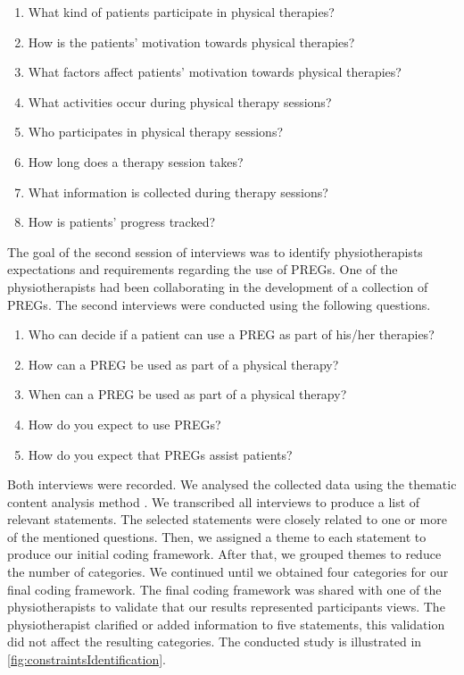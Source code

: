 \begin{enumerate}
    \item What kind of patients participate in physical therapies?
    \item How is the patients' motivation towards physical therapies?
    \item What factors affect patients' motivation towards physical therapies?
    \item What activities occur during physical therapy sessions?
    \item Who participates in physical therapy sessions?
    \item How long does a therapy session takes?
    \item What information is collected during therapy sessions?
    \item How is patients' progress tracked?
\end{enumerate}

The goal of the second session of interviews was to identify physiotherapists expectations and requirements regarding the use of \acp{PREG}. One of the physiotherapists had been collaborating in the development of a collection of \acp{PREG}. The second interviews were conducted using the following questions.

\begin{enumerate}
    \item Who can decide if a patient can use a \ac{PREG} as part of his/her therapies?
    \item How can a \ac{PREG} be used as part of a physical therapy?
    \item When can a \ac{PREG} be used as part of a physical therapy?
    \item How do you expect to use \acp{PREG}?
    \item How do you expect that \acp{PREG} assist patients?
\end{enumerate}

Both interviews were recorded. We analysed the collected data using the thematic content analysis method \autocite{Burnard2008}. We transcribed all interviews to produce a list of relevant statements. The selected statements were closely related to one or more of the mentioned questions. Then, we assigned a theme to each statement to produce our initial coding framework. After that, we grouped themes to reduce the number of categories. We continued until we obtained four categories for our final coding framework. The final coding framework was shared with one of the physiotherapists to validate that our results represented participants views. The physiotherapist clarified or added information to five statements, this validation did not affect the resulting categories. The conducted study is illustrated in \autoref{fig:constraintsIdentification}.

